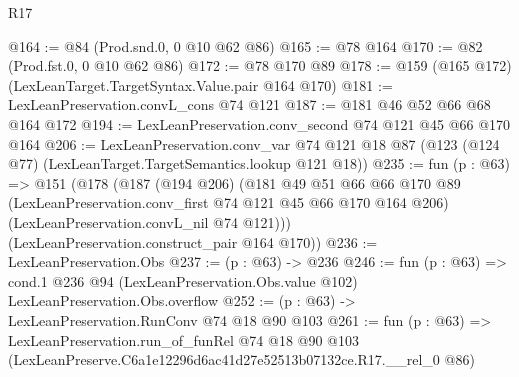 \begin{lexlean}{R17}
\begin{coremodule}
@164 := @84 (Prod.snd.{0, 0} @10 @62 @86)
@165 := @78 @164
@170 := @82 (Prod.fst.{0, 0} @10 @62 @86)
@172 := @78 @170 @89
@178 := @159 (@165 @172) (LexLeanTarget.TargetSyntax.Value.pair @164 @170)
@181 := LexLeanPreservation.convL_cons @74 @121
@187 := @181 @46 @52 @66 @68 @164 @172
@194 := LexLeanPreservation.conv_second @74 @121 @45 @66 @170 @164
@206 := LexLeanPreservation.conv_var
    @74
    @121
    @18
    @87
    (@123 (@124 @77) (LexLeanTarget.TargetSemantics.lookup @121 @18))
@235 := fun (p : @63) =>
  @151
    (@178
      (@187
        (@194 @206)
        (@181
          @49
          @51
          @66
          @66
          @170
          @89
          (LexLeanPreservation.conv_first @74 @121 @45 @66 @170 @164 @206)
          (LexLeanPreservation.convL_nil @74 @121)))
      (LexLeanPreservation.construct_pair @164 @170))
@236 := LexLeanPreservation.Obs
@237 := (p : @63) -> @236
@246 := fun (p : @63) =>
  cond.{1} @236 @94 (LexLeanPreservation.Obs.value @102) LexLeanPreservation.Obs.overflow
@252 := (p : @63) -> LexLeanPreservation.RunConv @74 @18 @90 @103
@261 := fun (p : @63) =>
  LexLeanPreservation.run_of_funRel
    @74
    @18
    @90
    @103
    (LexLeanPreserve.C6a1e12296d6ac41d27e52513b07132ce.R17.__rel_0 @86)
\end{coremodule}
\end{lexlean}
